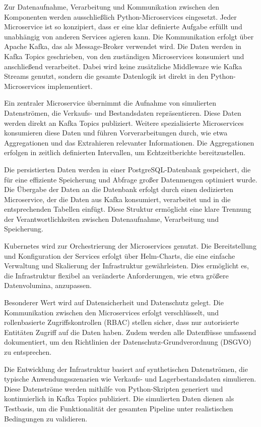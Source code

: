 \documentclass[%
pdftex,
oneside,			%
11pt,				%
parskip=half,		%
headheight = 12pt,	%
headsepline,		%
footsepline,		%
footheight = 16pt,	%
abstracton,		%
DIV=calc,		%
BCOR=8mm,		%
headinclude=false,	%
footinclude=false,	%
listof=totoc,		%
toc=bibliography,	%
]{scrreprt}	%
\begin{document}
    Zur Datenaufnahme, Verarbeitung und Kommunikation zwischen den Komponenten werden ausschließlich Python-Microservices eingesetzt.
    Jeder Microservice ist so konzipiert, dass er eine klar definierte Aufgabe erfüllt und unabhängig von anderen Services agieren kann.
    Die Kommunikation erfolgt über Apache Kafka, das als Message-Broker verwendet wird.
    Die Daten werden in Kafka Topics geschrieben, von den zuständigen Microservices konsumiert und anschließend verarbeitet.
    Dabei wird keine zusätzliche Middleware wie Kafka Streams genutzt, sondern die gesamte Datenlogik ist direkt in den Python-Microservices implementiert.

    Ein zentraler Microservice übernimmt die Aufnahme von simulierten Datenströmen, die Verkaufs- und Bestandsdaten repräsentieren.
    Diese Daten werden direkt an Kafka Topics publiziert.
    Weitere spezialisierte Microservices konsumieren diese Daten und führen Vorverarbeitungen durch, wie etwa Aggregationen und das Extrahieren relevanter Informationen.
    Die Aggregationen erfolgen in zeitlich definierten Intervallen, um Echtzeitberichte bereitzustellen.

    Die persistierten Daten werden in einer PostgreSQL-Datenbank gespeichert, die für eine effiziente Speicherung und Abfrage großer Datenmengen optimiert wurde.
    Die Übergabe der Daten an die Datenbank erfolgt durch einen dedizierten Microservice, der die Daten aus Kafka konsumiert, verarbeitet und in die entsprechenden Tabellen einfügt.
    Diese Struktur ermöglicht eine klare Trennung der Verantwortlichkeiten zwischen Datenaufnahme, Verarbeitung und Speicherung.

    Kubernetes wird zur Orchestrierung der Microservices genutzt.
    Die Bereitstellung und Konfiguration der Services erfolgt über Helm-Charts, die eine einfache Verwaltung und Skalierung der Infrastruktur gewährleisten.
    Dies ermöglicht es, die Infrastruktur flexibel an veränderte Anforderungen, wie etwa größere Datenvolumina, anzupassen.

    Besonderer Wert wird auf Datensicherheit und Datenschutz gelegt.
    Die Kommunikation zwischen den Microservices erfolgt verschlüsselt, und rollenbasierte Zugriffskontrollen (RBAC) stellen sicher, dass nur autorisierte Entitäten Zugriff auf die Daten haben.
    Zudem werden alle Datenflüsse umfassend dokumentiert, um den Richtlinien der Datenschutz-Grundverordnung (DSGVO) zu entsprechen.

    Die Entwicklung der Infrastruktur basiert auf synthetischen Datenströmen, die typische Anwendungsszenarien wie Verkaufs- und Lagerbestandsdaten simulieren.
    Diese Datenströme werden mithilfe von Python-Skripten generiert und kontinuierlich in Kafka Topics publiziert.
    Die simulierten Daten dienen als Testbasis, um die Funktionalität der gesamten Pipeline unter realistischen Bedingungen zu validieren.
\end{document}
